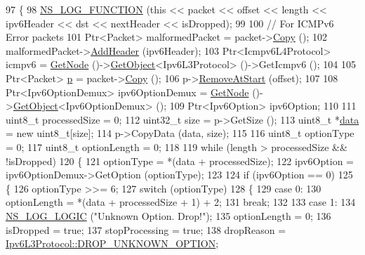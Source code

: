 \begin{DoxyCode}
97 \{
98   \hyperlink{log-macros-disabled_8h_a90b90d5bad1f39cb1b64923ea94c0761}{NS\_LOG\_FUNCTION} (\textcolor{keyword}{this} << packet << offset << length << ipv6Header << dst << nextHeader << 
      isDropped);
99 
100   \textcolor{comment}{// For ICMPv6 Error packets}
101   Ptr<Packet> malformedPacket = packet->\hyperlink{classns3_1_1Packet_a5d5c70802a5f77fc5f0001e0cfc1898b}{Copy} ();
102   malformedPacket->\hyperlink{classns3_1_1Packet_a465108c595a0bc592095cbcab1832ed8}{AddHeader} (ipv6Header);
103   Ptr<Icmpv6L4Protocol> icmpv6 = \hyperlink{classns3_1_1Ipv6Extension_a71cc2e202ef7605b1f645d8c6a384657}{GetNode} ()->\hyperlink{classns3_1_1Object_a13e18c00017096c8381eb651d5bd0783}{GetObject}<Ipv6L3Protocol> ()->GetIcmpv6 ();
104 
105   Ptr<Packet> \hyperlink{lte__link__budget_8m_ac9de518908a968428863f829398a4e62}{p} = packet->\hyperlink{classns3_1_1Packet_a5d5c70802a5f77fc5f0001e0cfc1898b}{Copy} ();
106   p->\hyperlink{classns3_1_1Packet_a78aa207e7921dd2f9f7e0d0b7a1c730a}{RemoveAtStart} (offset);
107 
108   Ptr<Ipv6OptionDemux> ipv6OptionDemux = \hyperlink{classns3_1_1Ipv6Extension_a71cc2e202ef7605b1f645d8c6a384657}{GetNode} ()->\hyperlink{classns3_1_1Object_a13e18c00017096c8381eb651d5bd0783}{GetObject}<Ipv6OptionDemux> ();
109   Ptr<Ipv6Option> ipv6Option;
110 
111   uint8\_t processedSize = 0;
112   uint32\_t size = p->GetSize ();
113   uint8\_t *\hyperlink{topology-example-sim_8cc_a26c65296e316af77b787dc77469bb2a4}{data} = \textcolor{keyword}{new} uint8\_t[size];
114   p->CopyData (data, size);
115 
116   uint8\_t optionType = 0;
117   uint8\_t optionLength = 0;
118 
119   \textcolor{keywordflow}{while} (length > processedSize && !isDropped)
120     \{
121       optionType = *(data + processedSize);
122       ipv6Option = ipv6OptionDemux->GetOption (optionType);
123 
124       \textcolor{keywordflow}{if} (ipv6Option == 0)
125         \{
126           optionType >>= 6;
127           \textcolor{keywordflow}{switch} (optionType)
128             \{
129             \textcolor{keywordflow}{case} 0:
130               optionLength = *(data + processedSize + 1) + 2;
131               \textcolor{keywordflow}{break};
132 
133             \textcolor{keywordflow}{case} 1:
134               \hyperlink{group__logging_ga88acd260151caf2db9c0fc84997f45ce}{NS\_LOG\_LOGIC} (\textcolor{stringliteral}{"Unknown Option. Drop!"});
135               optionLength = 0;
136               isDropped = \textcolor{keyword}{true};
137               stopProcessing = \textcolor{keyword}{true};
138               dropReason = \hyperlink{classns3_1_1Ipv6L3Protocol_a33c64db9bc35f71ff368b132bfffa37aa803fe59e441ce2bc53f0fe19df60c14a}{Ipv6L3Protocol::DROP\_UNKNOWN\_OPTION};

\end{DoxyCode}
